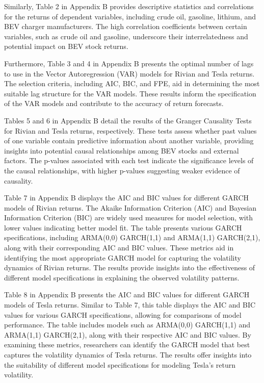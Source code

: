 \documentclass[a4paper,12pt]{article}
\begin{document}
Similarly, Table 2 in Appendix B provides descriptive statistics and correlations for the returns of dependent variables, including crude oil, gasoline, lithium, and BEV charger manufacturers. The high correlation coefficients between certain variables, such as crude oil and gasoline, underscore their interrelatedness and potential impact on BEV stock returns.

Furthermore, Table 3 and 4 in Appendix B presents the optimal number of lags to use in the Vector Autoregression (VAR) models for Rivian and Tesla returns. The selection criteria, including AIC, BIC, and FPE, aid in determining the most suitable lag structure for the VAR models. These results inform the specification of the VAR models and contribute to the accuracy of return forecasts.

Tables 5 and 6 in Appendix B detail the results of the Granger Causality Tests for Rivian and Tesla returns, respectively. These tests assess whether past values of one variable contain predictive information about another variable, providing insights into potential causal relationships among BEV stocks and external factors. The p-values associated with each test indicate the significance levels of the causal relationships, with higher p-values suggesting weaker evidence of causality.

Table 7 in Appendix B displays the AIC and BIC values for different GARCH models of Rivian returns. The Akaike Information Criterion (AIC) and Bayesian Information Criterion (BIC) are widely used measures for model selection, with lower values indicating better model fit. The table presents various GARCH specifications, including ARMA(0,0) GARCH(1,1) and ARMA(1,1) GARCH(2,1), along with their corresponding AIC and BIC values. These metrics aid in identifying the most appropriate GARCH model for capturing the volatility dynamics of Rivian returns. The results provide insights into the effectiveness of different model specifications in explaining the observed volatility patterns.

Table 8 in Appendix B presents the AIC and BIC values for different GARCH models of Tesla returns. Similar to Table 7, this table displays the AIC and BIC values for various GARCH specifications, allowing for comparisons of model performance. The table includes models such as ARMA(0,0) GARCH(1,1) and ARMA(1,1) GARCH(2,1), along with their respective AIC and BIC values. By examining these metrics, researchers can identify the GARCH model that best captures the volatility dynamics of Tesla returns. The results offer insights into the suitability of different model specifications for modeling Tesla's return volatility.
\end{document}

